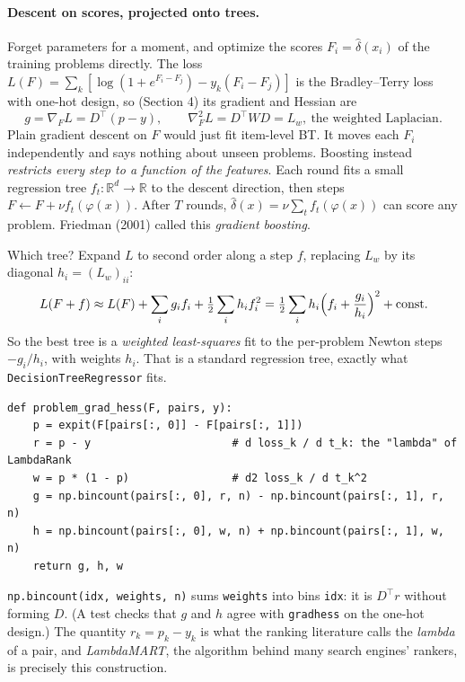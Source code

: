 \documentclass[11pt]{article}
\theoremstyle{definition}
\theoremstyle{plain}
\theoremstyle{remark}
\newcommand{\R}{\mathbb{R}}
\newcommand{\code}[1]{\texttt{#1}}
\renewcommand{\_}{\oldunderscore\allowbreak}
\newcommand{\file}[1]{\textcolor{blue!50!black}{\texttt{#1}}}
\newcommand{\codefrom}[1]{\par\smallskip\noindent{\footnotesize\textbf{From} \file{#1}}}
\begin{document}
\paragraph{Descent on scores, projected onto trees.}
Forget parameters for a moment, and optimize the scores $F_i=\hat\delta(x_i)$ of the training problems directly. The loss
$L(F)=\sum_k[\log(1+e^{F_i-F_j})-y_k(F_i-F_j)]$ is the Bradley--Terry loss with one-hot design, so (Section 4) its gradient and Hessian are
\[
  g=\nabla_FL=D^\top(p-y),\qquad \nabla_F^2L=D^\top WD=L_w,\ \text{the weighted Laplacian.}
\]
Plain gradient descent on $F$ would just fit item-level BT. It moves each $F_i$ independently and says nothing about unseen problems. Boosting
instead \emph{restricts every step to a function of the features}. Each round fits a small regression tree $f_t:\R^d\to\R$ to the descent
direction, then steps $F\leftarrow F+\nu f_t(\varphi(x))$. After $T$ rounds, $\hat\delta(x)=\nu\sum_tf_t(\varphi(x))$ can score any problem. Friedman (2001) called this
\emph{gradient boosting}.

Which tree? Expand $L$ to second order along a step $f$, replacing $L_w$ by its diagonal $h_i=(L_w)_{ii}$:
\[
  L(F+f)\approx L(F)+\sum_ig_if_i+\tfrac12\sum_ih_if_i^2=\tfrac12\sum_ih_i\Bigl(f_i+\frac{g_i}{h_i}\Bigr)^2+\text{const}.
\]
So the best tree is a \emph{weighted least-squares} fit to the per-problem Newton steps $-g_i/h_i$, with weights $h_i$. That is a standard regression tree,
exactly what \code{DecisionTreeRegressor} fits.

\codefrom{src/calcdiff/models/boosted\_bt.py}
\begin{lstlisting}
def problem_grad_hess(F, pairs, y):
    p = expit(F[pairs[:, 0]] - F[pairs[:, 1]])
    r = p - y                      # d loss_k / d t_k: the "lambda" of LambdaRank
    w = p * (1 - p)                # d2 loss_k / d t_k^2
    g = np.bincount(pairs[:, 0], r, n) - np.bincount(pairs[:, 1], r, n)
    h = np.bincount(pairs[:, 0], w, n) + np.bincount(pairs[:, 1], w, n)
    return g, h, w
\end{lstlisting}
\code{np.bincount(idx, weights, n)} sums \code{weights} into bins \code{idx}: it is $D^\top r$ without forming $D$. (A test checks that $g$ and $h$ agree
with \code{grad\_hess} on the one-hot design.) The quantity $r_k=p_k-y_k$ is what the ranking literature calls the \emph{lambda} of a pair, and
\emph{LambdaMART}, the algorithm behind many search engines' rankers, is precisely this construction.
\end{document}
